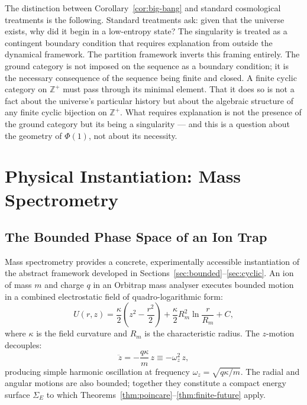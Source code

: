 \documentclass[twocolumn,10pt,a4paper]{article}
\theoremstyle{thmstyle}
\theoremstyle{definition}
\theoremstyle{remark}
\newcommand{\Zp}{\mathbb{Z}^{+}}
\newcommand{\PhiMap}{\varPhi}
\begin{document}
The distinction between Corollary~\ref{cor:big-bang} and standard cosmological treatments \citep{penrose1979,penrose2010,hawking1985} is the following. Standard treatments ask: given that the universe exists, why did it begin in a low-entropy state? The singularity is treated as a contingent boundary condition that requires explanation from outside the dynamical framework. The partition framework inverts this framing entirely. The ground category is not imposed on the sequence as a boundary condition; it is the necessary consequence of the sequence being finite and closed. A finite cyclic category on $\Zp$ must pass through its minimal element. That it does so is not a fact about the universe's particular history but about the algebraic structure of any finite cyclic bijection on $\Zp$. What requires explanation is not the presence of the ground category but its being a singularity --- and this is a question about the geometry of $\PhiMap(1)$, not about its necessity.

\section{Physical Instantiation: Mass Spectrometry}
\label{sec:massspec}

\subsection{The Bounded Phase Space of an Ion Trap}

Mass spectrometry provides a concrete, experimentally accessible instantiation of the abstract framework developed in Sections~\ref{sec:bounded}--\ref{sec:cyclic}. An ion of mass $m$ and charge $q$ in an Orbitrap mass analyser \citep{makarov2000} executes bounded motion in a combined electrostatic field of quadro-logarithmic form:
\begin{equation}
    U(r,z) = \frac{\kappa}{2}\left(z^2 - \frac{r^2}{2}\right) + \frac{\kappa}{2}R_m^2\ln\!\frac{r}{R_m} + C,
\end{equation}
where $\kappa$ is the field curvature and $R_m$ is the characteristic radius. The $z$-motion decouples:
\begin{equation}
    \ddot{z} = -\frac{q\kappa}{m}\,z \equiv -\omega_z^2\, z,
\end{equation}
producing simple harmonic oscillation at frequency $\omega_z = \sqrt{q\kappa/m}$. The radial and angular motions are also bounded; together they constitute a compact energy surface $\Sigma_E$ to which Theorems~\ref{thm:poincare}--\ref{thm:finite-future} apply.
\end{document}

